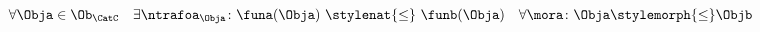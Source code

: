 {\begin{forslides}

    \begin{equation}\label{eq:ex_nt_27}
        \forall \Obja \in \Ob_\CatC \quad \exists \ntrafoa_{\Obja} \colon \funa(\Obja) \ \stylenat{\leq} \  \funb(\Obja) \quad  \forall \mora \colon \Obja \stylemorph{\leq} \Objb
    \end{equation}



\end{forslides}

}
